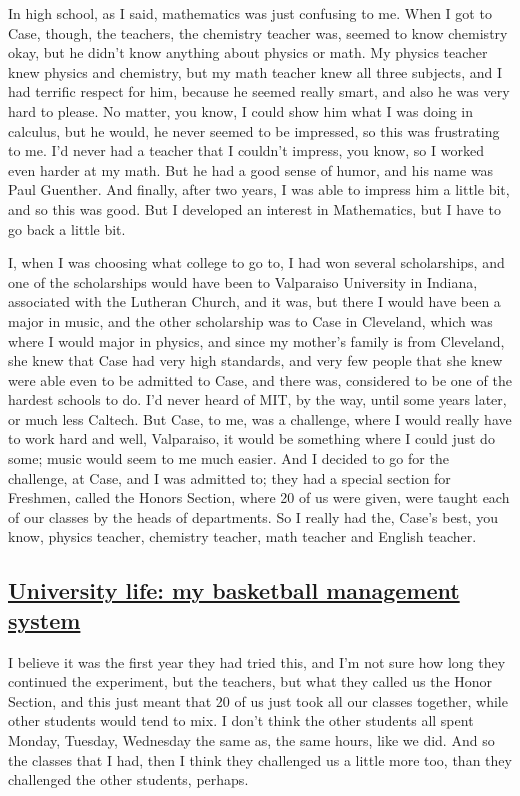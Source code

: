 \documentclass[]{article}
\begin{document}
In high school, as I said, mathematics was just confusing to me. When I
got to Case, though, the teachers, the chemistry teacher was, seemed to
know chemistry okay, but he didn't know anything about physics or math.
My physics teacher knew physics and chemistry, but my math teacher knew
all three subjects, and I had terrific respect for him, because he
seemed really smart, and also he was very hard to please. No matter, you
know, I could show him what I was doing in calculus, but he would, he
never seemed to be impressed, so this was frustrating to me. I'd never
had a teacher that I couldn't impress, you know, so I worked even harder
at my math. But he had a good sense of humor, and his name was Paul
Guenther. And finally, after two years, I was able to impress him a
little bit, and so this was good. But I developed an interest in
Mathematics, but I have to go back a little bit.

I, when I was choosing what college to go to, I had won several
scholarships, and one of the scholarships would have been to Valparaiso
University in Indiana, associated with the Lutheran Church, and it was,
but there I would have been a major in music, and the other scholarship
was to Case in Cleveland, which was where I would major in physics, and
since my mother's family is from Cleveland, she knew that Case had very
high standards, and very few people that she knew were able even to be
admitted to Case, and there was, considered to be one of the hardest
schools to do. I'd never heard of MIT, by the way, until some years
later, or much less Caltech. But Case, to me, was a challenge, where I
would really have to work hard and well, Valparaiso, it would be
something where I could just do some; music would seem to me much
easier. And I decided to go for the challenge, at Case, and I was
admitted to; they had a special section for Freshmen, called the Honors
Section, where 20 of us were given, were taught each of our classes by
the heads of departments. So I really had the, Case's best, you know,
physics teacher, chemistry teacher, math teacher and English teacher.

\subsection{\texorpdfstring{\href{http://webofstories.com/play/17070}{University
life: my basketball management
system}}{University life: my basketball management system}}\label{university-life-my-basketball-management-system}

I believe it was the first year they had tried this, and I'm not sure
how long they continued the experiment, but the teachers, but what they
called us the Honor Section, and this just meant that 20 of us just took
all our classes together, while other students would tend to mix. I
don't think the other students all spent Monday, Tuesday, Wednesday the
same as, the same hours, like we did. And so the classes that I had,
then I think they challenged us a little more too, than they challenged
the other students, perhaps.
\end{document}
